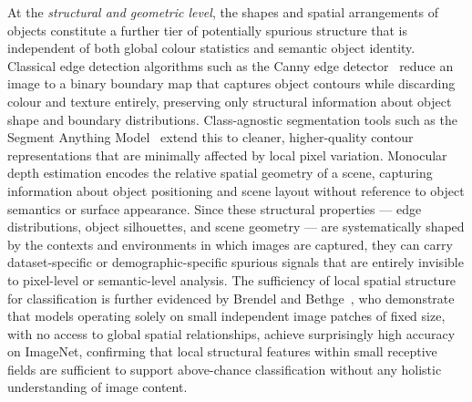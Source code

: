 At the \emph{structural and geometric level}, the shapes and spatial arrangements of objects
constitute a further tier of potentially spurious structure that is independent of both
global colour statistics and semantic object identity. Classical edge detection algorithms
such as the Canny edge detector~\cite{Canny_1986_CannyEdgeDetection} reduce
an image to a binary boundary map that captures object contours while discarding colour and
texture entirely, preserving only structural information about object shape and boundary
distributions. Class-agnostic segmentation tools such as the Segment Anything
Model~\cite{Kirillov_2023_SAM} extend this to cleaner, higher-quality contour
representations that are minimally affected by local pixel variation. Monocular depth
estimation encodes the relative spatial geometry of a scene, capturing information about
object positioning and scene layout without reference to object semantics or surface
appearance. Since these structural properties --- edge distributions, object silhouettes, and
scene geometry --- are systematically shaped by the contexts and environments in which images
are captured, they can carry dataset-specific or demographic-specific spurious signals that
are entirely invisible to pixel-level or semantic-level analysis. The sufficiency of local
spatial structure for classification is further evidenced by Brendel and
Bethge~\cite{Brendel_2019_BagNet}, who demonstrate that models operating solely on small
independent image patches of fixed size, with no access to global spatial relationships,
achieve surprisingly high accuracy on ImageNet, confirming that local structural features
within small receptive fields are sufficient to support above-chance classification without
any holistic understanding of image content.

